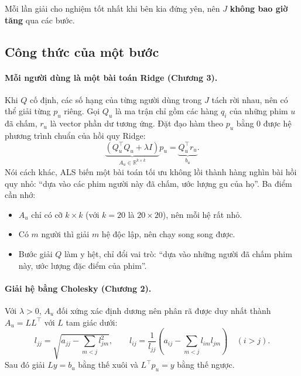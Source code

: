 Mỗi lần giải cho nghiệm tốt nhất khi bên kia đứng yên, nên $J$ \textbf{không bao giờ tăng} qua các bước.

\subsection{Công thức của một bước}

\paragraph{Mỗi người dùng là một bài toán Ridge (Chương 3).}
Khi $Q$ cố định, các số hạng của từng người dùng trong $J$ tách rời nhau, nên có thể giải từng $p_u$
riêng. Gọi $Q_u$ là ma trận chỉ gồm các hàng $q_i$ của những phim $u$ đã chấm, $r_u$ là vector phần
dư tương ứng. Đặt đạo hàm theo $p_u$ bằng 0 được hệ phương trình chuẩn của hồi quy Ridge:
\begin{equation}
  \underbrace{\left(Q_u^\top Q_u + \lambda I\right)}_{A_u \in \mathbb{R}^{k\times k}} p_u
  = \underbrace{Q_u^\top r_u}_{b_u} .
  \label{eq:als-ridge}
\end{equation}
Nói cách khác, ALS biến một bài toán tối ưu không lồi thành hàng nghìn bài hồi quy nhỏ: ``dựa vào các phim
người này đã chấm, ước lượng gu của họ''. Ba điểm cần nhớ:
\begin{itemize}
  \item $A_u$ chỉ có cỡ $k \times k$ (với $k = 20$ là $20 \times 20$), nên mỗi hệ rất nhỏ.
  \item Có $m$ người thì giải $m$ hệ độc lập, nên chạy song song được.
  \item Bước giải $Q$ làm y hệt, chỉ đổi vai trò: ``dựa vào những người đã chấm phim này, ước lượng đặc
        điểm của phim''.
\end{itemize}

\paragraph{Giải hệ bằng Cholesky (Chương 2).}
Với $\lambda > 0$, $A_u$ đối xứng xác định dương nên phân rã được duy nhất thành $A_u = LL^\top$ với
$L$ tam giác dưới:
\begin{equation}
  l_{jj} = \sqrt{a_{jj} - \sum_{m<j} l_{jm}^2}, \qquad
  l_{ij} = \frac{1}{l_{jj}}\left(a_{ij} - \sum_{m<j} l_{im} l_{jm}\right) \quad (i > j).
\end{equation}
Sau đó giải $Ly = b_u$ bằng thế xuôi và $L^\top p_u = y$ bằng thế ngược.

